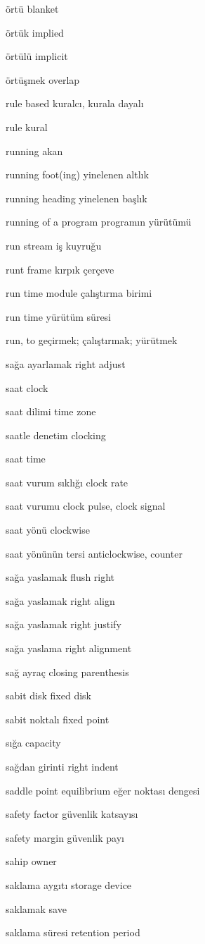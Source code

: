 \documentclass[12pt,fleqn]{article}\usepackage{../../common}
\begin{document}
örtü blanket

örtük implied

örtülü implicit

örtüşmek overlap

rule based kuralcı, kurala dayalı

rule kural

running akan

running foot(ing) yinelenen altlık

running heading yinelenen başlık

running of a program programın yürütümü

run stream iş kuyruğu

runt frame kırpık çerçeve

run time module çalıştırma birimi

run time yürütüm süresi

run, to geçirmek; çalıştırmak; yürütmek

sağa ayarlamak right adjust

saat clock

saat dilimi time zone

saatle denetim clocking

saat time

saat vurum sıklığı clock rate

saat vurumu clock pulse, clock signal

saat yönü clockwise

saat yönünün tersi anticlockwise, counter

sağa yaslamak flush right

sağa yaslamak right align

sağa yaslamak right justify

sağa yaslama right alignment

sağ ayraç closing parenthesis

sabit disk fixed disk

sabit noktalı fixed point

sığa capacity

sağdan girinti right indent

saddle point equilibrium eğer noktası dengesi

safety factor güvenlik katsayısı

safety margin güvenlik payı

sahip owner

saklama aygıtı storage device

saklamak save

saklama süresi retention period
\end{document}
